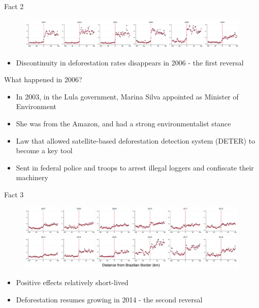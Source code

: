 \documentclass[11pt,notes=hide,aspectratio=169,mathserif]{beamer}
\begin{document}
\begin{frame}{Fact 2}
\begin{figure}
\centering
\includegraphics[width=1\textwidth]{../TA9/inputs/fig_2006.png}
\end{figure}
\begin{itemize}
\item Discontinuity in deforestation rates disappears in 2006 - the first reversal 
\end{itemize}
\end{frame}

\begin{frame}{What happened in 2006?}
\begin{itemize}
\item In 2003, in the Lula government, Marina Silva appointed as Minister of Environment
\item She was from the Amazon, and had a strong environmentalist stance
\item Law that allowed satellite-based deforestation detection system (DETER) to become a key tool
\item Sent in federal police and troops to arrest illegal loggers and confiscate their machinery
\end{itemize}
\end{frame}

\begin{frame}{Fact 3}
\begin{figure}
\centering
\includegraphics[width=1\textwidth]{../TA9/inputs/fig_post.png}
\end{figure}
\begin{itemize}
\item Positive effects relatively short-lived 
\item Deforestation resumes growing in 2014 - the second reversal
\end{itemize}
\end{frame}
\end{document}
